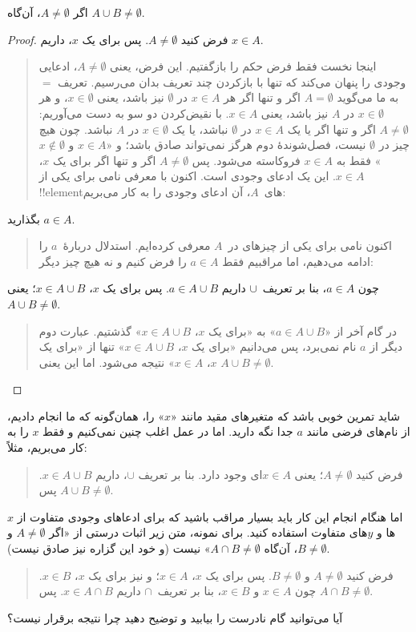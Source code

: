 \documentclass[../../../include/open-logic-section]{subfiles}
\begin{document}
\begin{prop}
اگر $A \neq \emptyset$، آن‌گاه $A \cup B \neq \emptyset$.
\end{prop}

\begin{proof}
  فرض کنید $A \neq \emptyset$. پس برای یک $x$، داریم $x \in A$.
  \begin{quote}
    اینجا نخست فقط فرض حکم را بازگفتیم. این فرض، یعنی
    $A \neq \emptyset$، ادعایی وجودی را پنهان می‌کند که تنها با
    بازکردن چند تعریف بدان می‌رسیم. تعریف $=$ به ما می‌گوید
    $A = \emptyset$ اگر و تنها اگر هر $x \in A$ در
    $\emptyset$ نیز باشد، یعنی $x \in \emptyset$، و هر
    $x \in \emptyset$ در $A$ نیز باشد، یعنی $x \in A$. با نقیض‌کردن
    دو سو به دست می‌آوریم:
    $A \neq \emptyset$ اگر و تنها اگر یا یک $x \in A$ در
    $\emptyset$ نباشد، یا یک $x \in \emptyset$ در $A$ نباشد. چون
    هیچ چیز در $\emptyset$ نیست، فصل‌شوندهٔ دوم هرگز نمی‌تواند صادق
    باشد؛ و «$x \in A$ و $x \notin \emptyset$» فقط به
    $x \in A$ فروکاسته می‌شود. پس
    $A \neq \emptyset$ اگر و تنها اگر برای یک $x$،
    $x \in A$. این یک ادعای وجودی است. اکنون با معرفی نامی برای یکی
    از !!{element}های~$A$، آن ادعای وجودی را به کار می‌بریم:
  \end{quote}
  بگذارید $a \in A$.
  \begin{quote}
    اکنون نامی برای یکی از چیزهای در~$A$ معرفی کرده‌ایم. استدلال
    دربارهٔ~$a$ را ادامه می‌دهیم، اما مراقبیم فقط $a \in A$ را فرض
    کنیم و نه هیچ چیز دیگر:
  \end{quote}
  چون $a \in A$، بنا بر تعریف~$\cup$ داریم
  $a \in A \cup B$. پس برای یک $x$، $x \in A \cup B$؛ یعنی
  $A \cup B \neq \emptyset$.
  \begin{quote}
    در گام آخر از «$a \in A \cup B$» به «برای یک $x$،
    $x \in A \cup B$» گذشتیم. عبارت دوم دیگر از $a$ نام نمی‌برد،
    پس می‌دانیم «برای یک $x$، $x \in A \cup B$» تنها از
    «برای یک $x$، $x \in A$» نتیجه می‌شود. اما این یعنی
    $A \cup B \neq \emptyset$.
  \end{quote}
\end{proof}

شاید تمرین خوبی باشد که متغیرهای مقید مانند «$x$» را، همان‌گونه که
ما انجام دادیم، از نام‌های فرضی مانند $a$ جدا نگه دارید. اما در عمل
اغلب چنین نمی‌کنیم و فقط $x$ را به کار می‌بریم، مثلاً:
\begin{quote}
فرض کنید $A \neq \emptyset$؛ یعنی $x \in A$ای وجود دارد. بنا بر
تعریف $\cup$، داریم $x \in A \cup B$. پس
$A \cup B \neq \emptyset$.
\end{quote}
اما هنگام انجام این کار باید بسیار مراقب باشید که برای ادعاهای
وجودی متفاوت از $x$ها و $y$های متفاوت استفاده کنید. برای نمونه،
متن زیر اثبات درستی از «اگر $A \neq \emptyset$ و
$B \neq \emptyset$، آن‌گاه $A \cap B \neq \emptyset$» نیست (و خود
این گزاره نیز صادق نیست).
\begin{quote}
فرض کنید $A \neq \emptyset$ و $B \neq \emptyset$. پس برای یک $x$،
$x \in A$؛ و نیز برای یک $x$، $x \in B$. چون $x \in A$ و
$x \in B$، بنا بر تعریف~$\cap$ داریم $x \in A \cap B$. پس
$A \cap B \neq \emptyset$.
\end{quote}
آیا می‌توانید گام نادرست را بیابید و توضیح دهید چرا نتیجه برقرار
نیست؟
\end{document}
